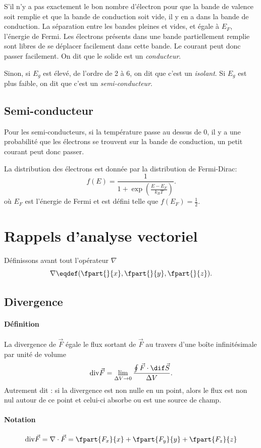 S'il n'y a pas exactement le bon nombre d'électron pour
que la bande de valence soit remplie et que la bande de conduction soit
vide, il y en a dans la bande de conduction.
La séparation entre les bandes pleines et vides, et égale à $E_F$,
l'énergie de Fermi.
Les électrons présents dans une bande partiellement remplie sont libres de se
déplacer facilement dans cette bande. Le courant peut donc passer facilement.
On dit que le solide est un \emph{conducteur}.

Sinon, si $E_g$ est élevé, de l'ordre de 2 à \si{6}{\electronvolt},
on dit que c'est un \emph{isolant}.
Si $E_g$ est plus faible, on dit que c'est un \emph{semi-conducteur}.

\subsection{Semi-conducteur}
Pour les semi-conducteurs,
si la température passe au dessus de \si{0}{\kelvin},
il y a une probabilité que les électrons
se trouvent sur la bande de conduction,
un petit courant peut donc passer.

La distribution des électrons est donnée par la distribution de Fermi-Dirac:
\[ f(E) = \frac{1}{1+\exp\left(\frac{E-E_F}{k_BT}\right)}. \]
où $E_F$ est l'énergie de Fermi et est défini telle que
$f(E_F) = \frac{1}{2}$.

\appendix
\section{Rappels d'analyse vectoriel}
Définissons avant tout l'opérateur $\nabla$
\[ \nabla  \eqdef (\fpart{}{x}, \fpart{}{y}, \fpart{}{z}).\]
\subsection{Divergence}
\paragraph{Définition} 
La divergence de $\vec{F}$ égale le flux sortant de $\vec{F}$ 
au travers d'une boîte infinitésimale par unité de volume
\[ {\rm div}{\vec{F}} = \lim_{\Delta V \to 0} \frac{\oint{\vec{F}\cdot\dif\vec{S}}}{\Delta V}.\]
Autrement dit : si la divergence est non nulle en un point, alors le flux est
non nul autour de ce point et celui-ci absorbe ou est une source de champ.
\paragraph{Notation}
\[ {\rm div}{\vec{F}} = \nabla\cdot\vec{F} = \fpart{F_x}{x} + \fpart{F_y}{y} + \fpart{F_z}{z}\]

